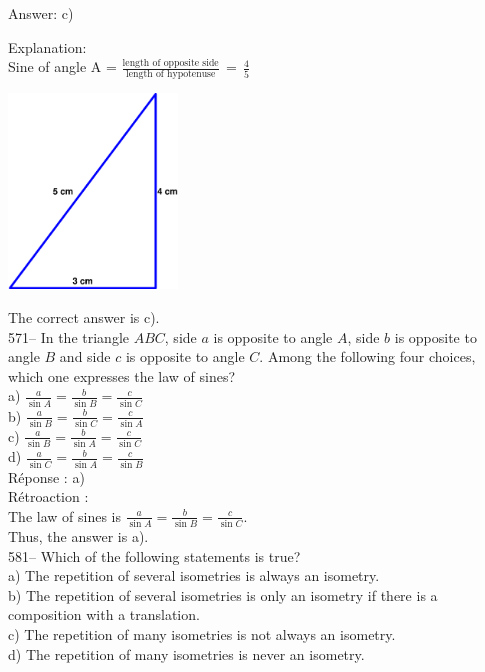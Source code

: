 \documentclass[letterpaper, 12pt]{article}
\begin{document}
Answer: c)

Explanation: \\
Sine of angle A = $\frac{\textrm{length of opposite side}}{\textrm{length of hypotenuse}}\,=\,\frac{\textrm{4}}{\textrm{5}}$\\
\begin{center}
    \includegraphics[width=4.5cm]{triangle21.eps}
    \end{center}
The correct answer is c).\\


571-- In the triangle $ABC$, side $a$ is opposite to
angle $A$, side $b$ is opposite to angle $B$ and side $c$ is opposite to angle $C$.
Among the following four choices, which one expresses the law of sines?\\

a) $\frac{a}{\sin A}=\frac{b}{\sin B}=\frac{c}{\sin C}$\\[2mm]
b) $\frac{a}{\sin B}=\frac{b}{\sin C}=\frac{c}{\sin A}$\\[2mm]
c) $\frac{a}{\sin B}=\frac{b}{\sin A}=\frac{c}{\sin C}$\\[2mm]
d) $\frac{a}{\sin C}=\frac{b}{\sin A}=\frac{c}{\sin B}$\\

R\'eponse : a)\\

R\'etroaction : \\
The law of sines is $\frac{a}{\sin A}=\frac{b}{\sin B}=\frac{c}{\sin
C}$.\\[2mm]
Thus, the answer is a).\\


581-- Which of the following statements is true?\\

a) The repetition of several isometries is always an isometry.\\
b) The repetition of several isometries is only an isometry
if there is a composition with a translation.\\
c) The repetition of many isometries is not always an isometry.\\
d) The repetition of many isometries is never an isometry.\\
\end{document}
